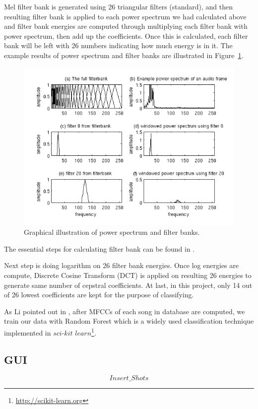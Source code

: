 \documentclass[whitelogo,12pt]{tudelft-report}
\begin{document}
Mel filter bank is generated using 26 triangular filters (standard), and then resulting filter bank is applied to each power spectrum we had calculated above and filter bank energies are computed through multiplying each filter bank with power spectrum, then add up the coefficients. Once this is calculated, each filter bank will be left with 26 numbers indicating how much energy is in it. The example results of power spectrum and filter banks are illustrated in Figure~\ref{fig:filter}.
\begin{figure}
\centering
\includegraphics[scale=0.7]{mel_filterbank_example}
\captionsetup{justification=centering}
\caption{Graphical illustration of power spectrum and filter banks.}
\label{fig:filter}
\end{figure}
The essential steps for calculating filter bank can be found in \cite{milner2002}.

Next step is doing logarithm on 26 filter bank energies. Once log energies are compute, Discrete Cosine Transform (DCT) is applied on resulting 26 energies to generate same number of cepstral coefficients. At last, in this project, only 14 out of 26 lowest coefficients are kept for the purpose of classifying.

As Li pointed out in \cite{li2015}, after MFCCs of each song in database are computed, we train our data with Random Forest which is a widely used classification technique implemented in $sci$-$kit$ $learn$\footnote{\url{http://scikit-learn.org}}. 

\subsection{GUI}
\[Insert\_Shots\]
\end{document}
